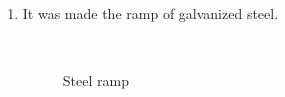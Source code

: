 \begin{enumerate}
\begin{enumerate}
		 \item It was made the ramp of galvanized steel.
		 		         \begin{figure}[H]
		 		         	\begin{minipage}[h]{0.15\linewidth}
		 		         		\center  
		 		         	\end{minipage}
		 		         	\begin{minipage}[h]{0.6\linewidth}
		 		         		\caption{Steel ramp}
		 		         	\end{minipage}
		 		         \end{figure}		 
		 

\end{enumerate}
\end{enumerate}
